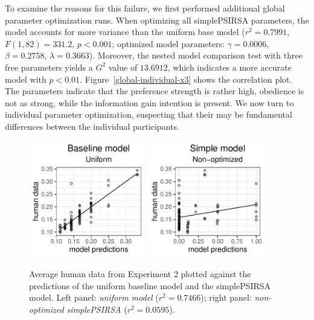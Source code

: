\documentclass[11pt,a4paper]{article}
\begin{document}
To examine the reasons for this failure, we first performed additional global parameter optimization runs.
When optimizing all simplePSIRSA parameters, the model accounts for more variance than the uniform base model ($r^2=0.7991$, $F(1,82) = 331.2$, $p<0.001$; optimized model parameters: $\gamma=0.0006$, $\beta=0.2758$, $\lambda=0.3663$).
Moreover, the nested model comparison test with three free parameters yields a $G^2$ value of $13.6912$, which indicates a more accurate model with $p<0.01$. 
Figure~\ref{global-individual-x3} shows the correlation plot. 
The parameters indicate that the preference strength is rather high, obedience is not as strong, while the information gain intention is present. 
We now turn to individual parameter optimization, suspecting that their may be fundamental differences between the individual participants. 




\begin{figure}[ht]
	\centering
	\includegraphics[width=2in]{images/x3_m20.pdf}
	\includegraphics[width=2in]{images/x3_m7.pdf}
	\caption{Average human data from Experiment 2 plotted against the predictions of the uniform baseline model and the simplePSIRSA model. 
		Left panel: \emph{uniform model} ($r^{2}=0.7466$);
		right panel: \emph{non-optimized simplePSIRSA} ($r^2=0.0595$).
	}
	\label{base-nonopt-x3}
\end{figure}
\end{document}
